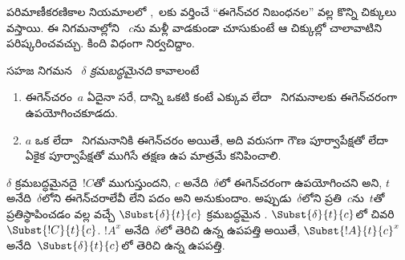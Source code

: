 \documentclass[../../../include/open-logic-section]{subfiles}
\begin{document}


పరిమాణీకరణికాల నియమాలలో \Elim{\lexists},~\Intro{\lforall}లకు వర్తించే ``ఈగెన్‌చర నిబంధనల'' వల్ల కొన్ని చిక్కులు వస్తాయి. ఈ నిగమనాల్లోని ~$c$ను మళ్లీ వాడకుండా చూసుకుంటే ఆ చిక్కుల్లో చాలావాటిని పరిష్కరించవచ్చు. కింది విధంగా నిర్వచిద్దాం.

\begin{defn}
సహజ నిగమన ~$\delta$ \emph{క్రమబద్ధమైనది} కావాలంటే
\begin{enumerate}
  \item ఈగెన్‌చరం~$a$ ఏదైనా సరే, దాన్ని ఒకటి కంటే ఎక్కువ \Elim{\lexists} లేదా~\Intro{\lforall} నిగమనాలకు ఈగెన్‌చరంగా ఉపయోగించకూడదు.
  \item $a$ ఒక \Elim{\lexists} లేదా~\Intro{\lforall} నిగమనానికి ఈగెన్‌చరం అయితే, అది వరుసగా గౌణ పూర్వాపేక్షతో లేదా ఏకైక పూర్వాపేక్షతో ముగిసే తక్షణ ఉప మాత్రమే కనిపించాలి.
\end{enumerate}
\end{defn}

\begin{lem} $\delta$ క్రమబద్ధమైనదై~$!C$తో ముగుస్తుందని, $c$ అనేది~$\delta$లో ఈగెన్‌చరంగా ఉపయోగించని  అని, $t$ అనేది~$\delta$లోని ఈగెన్‌చరాలేవీ లేని పదం అని అనుకుందాం. అప్పుడు~$\delta$లోని ప్రతి~$c$ను~$t$తో ప్రతిస్థాపించడం వల్ల వచ్చే $\Subst{\delta}{t}{c}$ క్రమబద్ధమైన . $\Subst{\delta}{t}{c}$లో చివరి  $\Subst{!C}{t}{c}$. $!A^x$ అనేది~$\delta$లో తెరిచి ఉన్న ఉపపత్తి అయితే, $\Subst{!A}{t}{c}^x$ అనేది~$\Subst{\delta}{t}{c}$లో తెరిచి ఉన్న ఉపపత్తి.
\end{lem}
\end{document}
